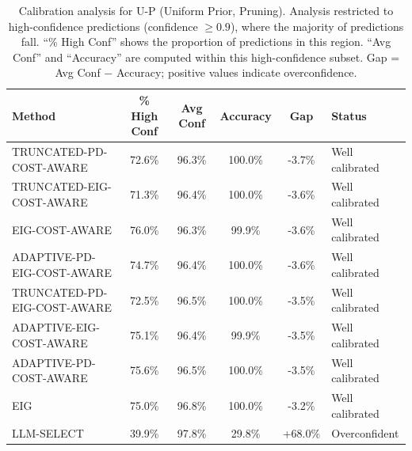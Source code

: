 \begin{table}[htbp]
\centering
\small
\caption{Calibration analysis for U-P (Uniform Prior, Pruning). Analysis restricted to high-confidence predictions (confidence $\geq 0.9$), where the majority of predictions fall. ``\% High Conf'' shows the proportion of predictions in this region. ``Avg Conf'' and ``Accuracy'' are computed within this high-confidence subset. Gap = Avg Conf $-$ Accuracy; positive values indicate overconfidence.}
\label{tab:calibration-prune_uniform}
\begin{tabular}{@{}lccccl@{}}
\toprule
Method & \% High Conf & Avg Conf & Accuracy & Gap & Status \\
\midrule
TRUNCATED-PD-COST-AWARE & 72.6\% & 96.3\% & 100.0\% & -3.7\% & Well calibrated \\
TRUNCATED-EIG-COST-AWARE & 71.3\% & 96.4\% & 100.0\% & -3.6\% & Well calibrated \\
EIG-COST-AWARE & 76.0\% & 96.3\% & 99.9\% & -3.6\% & Well calibrated \\
ADAPTIVE-PD-EIG-COST-AWARE & 74.7\% & 96.4\% & 100.0\% & -3.6\% & Well calibrated \\
TRUNCATED-PD-EIG-COST-AWARE & 72.5\% & 96.5\% & 100.0\% & -3.5\% & Well calibrated \\
ADAPTIVE-EIG-COST-AWARE & 75.1\% & 96.4\% & 99.9\% & -3.5\% & Well calibrated \\
ADAPTIVE-PD-COST-AWARE & 75.6\% & 96.5\% & 100.0\% & -3.5\% & Well calibrated \\
EIG & 75.0\% & 96.8\% & 100.0\% & -3.2\% & Well calibrated \\
LLM-SELECT & 39.9\% & 97.8\% & 29.8\% & +68.0\% & Overconfident \\
\bottomrule
\end{tabular}
\end{table}